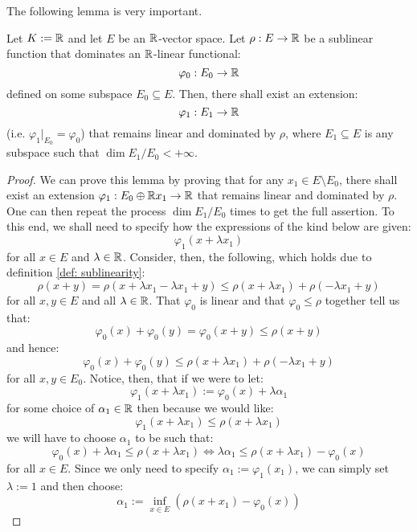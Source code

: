         The following lemma is very important.
        \begin{lemma} \label{lemma: sublinear_functions_extend_finitely}
            Let $K := \mathbb{R}$ and let $E$ be an $\mathbb{R}$-vector space. Let $\rho: E \to \mathbb{R}$ be a sublinear function that dominates an $\mathbb{R}$-linear functional:
                $$\varphi_0: E_0 \to \mathbb{R}$$
            defined on some subspace $E_0 \subseteq E$. Then, there shall exist an extension:
                $$\varphi_1: E_1 \to \mathbb{R}$$
            (i.e. $\varphi_1|_{E_0} = \varphi_0$) that remains linear and dominated by $\rho$, where $E_1 \subseteq E$ is any subspace such that $\dim E_1/E_0 < +\infty$. 
        \end{lemma}
            \begin{proof}
                We can prove this lemma by proving that for any $x_1 \in E \setminus E_0$, there shall exist an extension $\varphi_1: E_0 \oplus \mathbb{R} x_1 \to \mathbb{R}$ that remains linear and dominated by $\rho$. One can then repeat the process $\dim E_1/E_0$ times to get the full assertion. To this end, we shall need to specify how the expressions of the kind below are given:
                    $$\varphi_1( x + \lambda x_1 )$$
                for all $x \in E$ and $\lambda \in \mathbb{R}$. Consider, then, the following, which holds due to definition \ref{def: sublinearity}:
                    $$\rho(x + y) = \rho( x + \lambda x_1 - \lambda x_1 + y ) \leq \rho(x + \lambda x_1) + \rho(-\lambda x_1 + y)$$
                for all $x, y \in E$ and all $\lambda \in \mathbb{R}$. That $\varphi_0$ is linear and that $\varphi_0 \leq \rho$ together tell us that:
                    $$\varphi_0(x) + \varphi_0(y) = \varphi_0(x + y) \leq \rho(x + y)$$
                and hence:
                    $$\varphi_0(x) + \varphi_0(y) \leq \rho(x + \lambda x_1) + \rho(-\lambda x_1 + y)$$
                for all $x, y \in E_0$. Notice, then, that if we were to let:
                    $$\varphi_1(x + \lambda x_1) := \varphi_0(x) + \lambda \alpha_1$$
                for some choice of $\alpha_1 \in \mathbb{R}$ then because we would like:
                    $$\varphi_1(x + \lambda x_1) \leq \rho(x + \lambda x_1)$$
                we will have to choose $\alpha_1$ to be such that:
                    $$\varphi_0(x) + \lambda \alpha_1 \leq \rho(x + \lambda x_1) \iff \lambda \alpha_1 \leq \rho(x + \lambda x_1) - \varphi_0(x)$$
                for all $x \in E$. Since we only need to specify $\alpha_1 := \varphi_1(x_1)$, we can simply set $\lambda := 1$ and then choose:
                    $$\alpha_1 := \inf_{x \in E} \left( \rho(x + x_1) - \varphi_0(x) \right)$$
            \end{proof}
